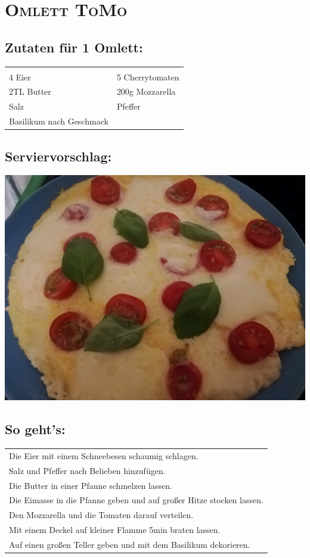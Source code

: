 \section{\textsc{Omlett ToMo}}

\subsection*{Zutaten für 1 Omlett:}

\begin{tabular}{p{7.5cm} p{7.5cm}}
	& \\
	4 Eier & 5 Cherrytomaten \\
	2TL Butter & 200g Mozzarella \\
	Salz & Pfeffer \\
	Basilikum nach Geschmack &
\end{tabular}

\subsection*{Serviervorschlag:}

\includegraphics[width=\textwidth]{img/omlett/omlett_tomo_fertig.jpg} \cite{omlettomo}

\subsection*{So geht's:}

\begin{tabular}{p{15cm}}
	\\
	Die Eier mit einem Schneebesen schaumig schlagen.\\
	Salz und Pfeffer nach Belieben hinzufügen.\\
	Die Butter in einer Pfanne schmelzen lassen.\\
	Die Eimasse in die Pfanne geben und auf großer Hitze stocken lassen.\\
	Den Mozzarella und die Tomaten darauf verteilen.\\
	Mit einem Deckel auf kleiner Flamme 5min braten lassen.\\
	Auf einen großen Teller geben und mit dem Basilikum dekorieren.\\
\end{tabular}
